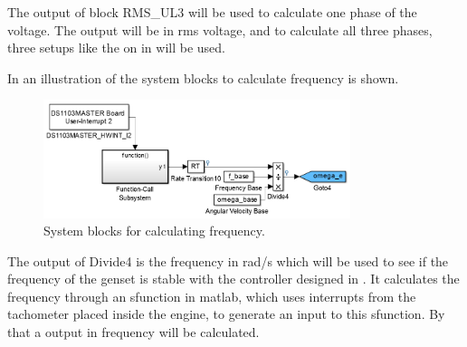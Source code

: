 The output of block RMS\_UL3 will be used to calculate one phase of the voltage. The output will be in rms voltage, and to calculate all three phases, three setups like the on in  will be used. 

In  an illustration of the system blocks to calculate frequency is shown. 

\begin{figure}[H]
\centering
\includegraphics[width=0.8\textwidth]{rapport/billeder/CAN_frequency}
\caption{System blocks for calculating frequency.}
\label{fig:CAN_frequency}
\end{figure} 

The output of Divide4 is the frequency in rad/s which will be used to see if the frequency of the genset is stable with the controller designed in . 
It calculates the frequency through an sfunction in matlab, which uses interrupts from the tachometer placed inside the engine, to generate an input to this sfunction. By that a output in frequency will be calculated. 


